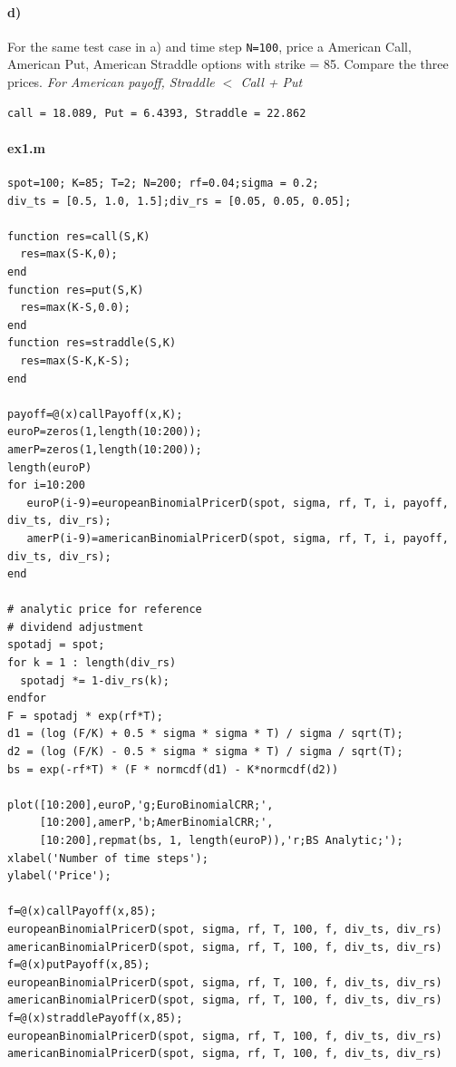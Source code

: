 \documentclass[12pt,a4paper,hidelinks,fleqn]{article}            %
\begin{document}
\vspace{-1cm}
\paragraph{d)} For the same test case in a) and time step \verb-N=100-, 
price a American Call, American Put, American Straddle options with strike = 85. 
Compare the three prices.
\emph{For American payoff, Straddle $<$ Call + Put}
\begin{verbatim}
call = 18.089, Put = 6.4393, Straddle = 22.862
\end{verbatim}


\paragraph{ex1.m}
\begin{small}
\begin{verbatim}
spot=100; K=85; T=2; N=200; rf=0.04;sigma = 0.2;
div_ts = [0.5, 1.0, 1.5];div_rs = [0.05, 0.05, 0.05];

function res=call(S,K)
  res=max(S-K,0);
end 
function res=put(S,K)
  res=max(K-S,0.0);
end 
function res=straddle(S,K)
  res=max(S-K,K-S);
end 

payoff=@(x)callPayoff(x,K);
euroP=zeros(1,length(10:200));
amerP=zeros(1,length(10:200));
length(euroP)
for i=10:200
   euroP(i-9)=europeanBinomialPricerD(spot, sigma, rf, T, i, payoff, div_ts, div_rs);
   amerP(i-9)=americanBinomialPricerD(spot, sigma, rf, T, i, payoff, div_ts, div_rs);
end 

# analytic price for reference
# dividend adjustment
spotadj = spot;
for k = 1 : length(div_rs)
  spotadj *= 1-div_rs(k);
endfor
F = spotadj * exp(rf*T);
d1 = (log (F/K) + 0.5 * sigma * sigma * T) / sigma / sqrt(T);
d2 = (log (F/K) - 0.5 * sigma * sigma * T) / sigma / sqrt(T); 
bs = exp(-rf*T) * (F * normcdf(d1) - K*normcdf(d2))

plot([10:200],euroP,'g;EuroBinomialCRR;',
     [10:200],amerP,'b;AmerBinomialCRR;',
     [10:200],repmat(bs, 1, length(euroP)),'r;BS Analytic;');
xlabel('Number of time steps');
ylabel('Price');

f=@(x)callPayoff(x,85);
europeanBinomialPricerD(spot, sigma, rf, T, 100, f, div_ts, div_rs)
americanBinomialPricerD(spot, sigma, rf, T, 100, f, div_ts, div_rs)
f=@(x)putPayoff(x,85);
europeanBinomialPricerD(spot, sigma, rf, T, 100, f, div_ts, div_rs)
americanBinomialPricerD(spot, sigma, rf, T, 100, f, div_ts, div_rs)
f=@(x)straddlePayoff(x,85);
europeanBinomialPricerD(spot, sigma, rf, T, 100, f, div_ts, div_rs)
americanBinomialPricerD(spot, sigma, rf, T, 100, f, div_ts, div_rs)
\end{verbatim}

\end{small}
\end{document}
